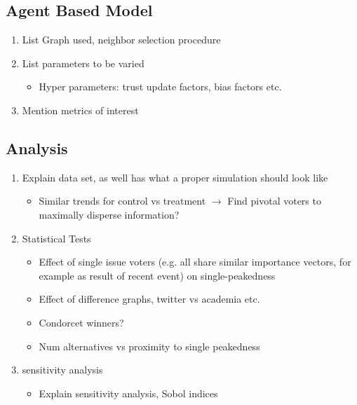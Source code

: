 \subsection{Agent Based Model}
\begin{enumerate}
	\item List Graph used, neighbor selection procedure
	\item List parameters to be varied
	      \begin{itemize}
		      \item Hyper parameters: trust update factors, bias factors etc.
	      \end{itemize}
	\item Mention metrics of interest
\end{enumerate}
\subsection{Analysis}
\begin{enumerate}
	\item Explain data set, as well has what a proper simulation should look like
	      \begin{itemize}
		      \item Similar trends for control vs treatment $\to$ Find pivotal voters to maximally disperse information?
	      \end{itemize}

	\item Statistical Tests

	      \begin{itemize}
		      \item Effect of single issue voters (e.g. all share similar importance vectors, for example as result of recent event) on single-peakedness
		      \item Effect of difference graphs, twitter vs academia etc.
		      \item Condorcet winners?
		      \item Num alternatives vs proximity to single peakedness
	      \end{itemize}
	\item sensitivity analysis
	      \begin{itemize}
		      \item Explain sensitivity analysis, Sobol indices
	      \end{itemize}
\end{enumerate}

